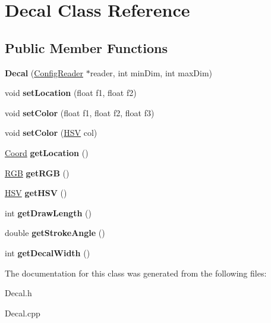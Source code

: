 \hypertarget{class_decal}{\section{Decal Class Reference}
\label{class_decal}
}
\subsection*{Public Member Functions}
\begin{DoxyCompactItemize}
\item 
\hypertarget{class_decal_a101d637231bbe15438573ff44481e025}{{\bfseries Decal} (\hyperlink{class_config_reader}{Config\-Reader} $\ast$reader, int min\-Dim, int max\-Dim)}\label{class_decal_a101d637231bbe15438573ff44481e025}

\item 
\hypertarget{class_decal_aca34cd0f099e08c77d5309eb1177b6db}{void {\bfseries set\-Location} (float f1, float f2)}\label{class_decal_aca34cd0f099e08c77d5309eb1177b6db}

\item 
\hypertarget{class_decal_ad59c6e4cfb8b06e7403aaf7a12a96ba8}{void {\bfseries set\-Color} (float f1, float f2, float f3)}\label{class_decal_ad59c6e4cfb8b06e7403aaf7a12a96ba8}

\item 
\hypertarget{class_decal_a4b3153696a223ec85c53e22876023a14}{void {\bfseries set\-Color} (\hyperlink{struct_h_s_v}{H\-S\-V} col)}\label{class_decal_a4b3153696a223ec85c53e22876023a14}

\item 
\hypertarget{class_decal_abcf93a8a28597b3e07ca8268af2ef049}{\hyperlink{struct_coord}{Coord} {\bfseries get\-Location} ()}\label{class_decal_abcf93a8a28597b3e07ca8268af2ef049}

\item 
\hypertarget{class_decal_a88024aec965f854e6ee74867b107963c}{\hyperlink{struct_r_g_b}{R\-G\-B} {\bfseries get\-R\-G\-B} ()}\label{class_decal_a88024aec965f854e6ee74867b107963c}

\item 
\hypertarget{class_decal_a78513a5e1b703ae65933f20f45cf8011}{\hyperlink{struct_h_s_v}{H\-S\-V} {\bfseries get\-H\-S\-V} ()}\label{class_decal_a78513a5e1b703ae65933f20f45cf8011}

\item 
\hypertarget{class_decal_a7d789f497a9019c4ab1fc2377038fc32}{int {\bfseries get\-Draw\-Length} ()}\label{class_decal_a7d789f497a9019c4ab1fc2377038fc32}

\item 
\hypertarget{class_decal_ad25e74f9b24b4487713a64fd2b8711c0}{double {\bfseries get\-Stroke\-Angle} ()}\label{class_decal_ad25e74f9b24b4487713a64fd2b8711c0}

\item 
\hypertarget{class_decal_ab455f1768097265f73022194f2830861}{int {\bfseries get\-Decal\-Width} ()}\label{class_decal_ab455f1768097265f73022194f2830861}

\end{DoxyCompactItemize}


The documentation for this class was generated from the following files\-:\begin{DoxyCompactItemize}
\item 
Decal.\-h\item 
Decal.\-cpp\end{DoxyCompactItemize}
